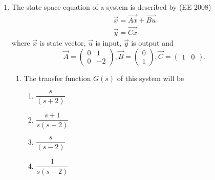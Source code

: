 \begin{enumerate}[label=\thesubsection.\arabic*,ref=\thesubsection.\theenumi]
\begin{enumerate}
\item  The charge stored in the capacitor at $t = 5~\mu\text{s}$ will be
\begin{multicols}{4}
\begin{enumerate}
    \item 8 nC
    \item 10 nC
    \item 13 nC
    \item 16 nC
\end{enumerate}
\end{multicols}

\item The capacitor charged up to $5~\mu\text{s}$, as per the current profile given in the figure, is connected across an inductor of $0.6~\text{mH}$. Then the value of voltage across the capacitor after $1~\mu\text{s}$ will approximately be
\begin{multicols}{4}
\begin{enumerate}
    \item 18.8 V
    \item 23.5 V
    \item $-23.5$ V
    \item $-30.6$ V
\end{enumerate}
\end{multicols}
\end{enumerate}

\item 
The state space equation of a system is described by
\hfill (EE 2008) 
\begin{align*}
\vec{x} = \vec{Ax} + \vec{Bu}\\
\vec{y} = \vec{Cx}
\end{align*}
where $\vec{x}$ is state vector, $\vec{u}$ is input, $\vec{y}$ is output and
\[
\vec{A}=\begin{pmatrix}0&1\\0&-2\end{pmatrix},
\vec{B}=\begin{pmatrix}0\\1\end{pmatrix},
\vec{C}=\begin{pmatrix}1&0\end{pmatrix}.
\]

\begin{enumerate}
\item The transfer function $G(s)$ of this system will be
\begin{multicols}{4}
\begin{enumerate}
    \item $\dfrac{s}{(s+2)}$
    \item $\dfrac{s+1}{s(s-2)}$
    \item $\dfrac{s}{(s-2)}$
    \item $\dfrac{1}{s(s+2)}$
\end{enumerate}
\end{multicols}



\end{enumerate}
\end{enumerate}
